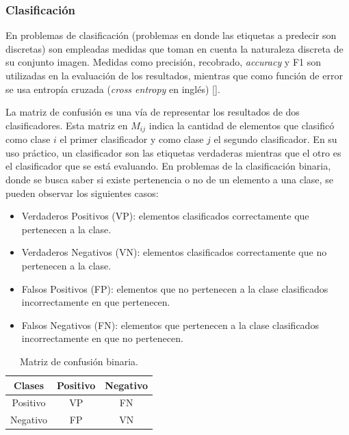 \subsubsection{Clasificación}

En problemas de clasificación (problemas en donde las etiquetas a predecir son discretas) 
son empleadas medidas que toman en cuenta la naturaleza discreta de su conjunto imagen.
Medidas como precisión, recobrado, \emph{accuracy} y F1 son utilizadas en la 
evaluación de los resultados, mientras que como función de error se usa entropía cruzada 
(\emph{cross entropy} en inglés) [\cite{grandini2020metrics}].

La matriz de confusión es una vía de representar los resultados de dos clasificadores. Esta matriz en $M_{ij}$ 
indica la cantidad de elementos que clasificó como clase $i$ el primer clasificador y
como clase $j$ el segundo clasificador. En su uso práctico,
un clasificador son las etiquetas verdaderas mientras que el otro es el clasificador que se está evaluando. 
En problemas de la clasificación binaria, donde se busca saber si existe pertenencia o no de un elemento a una clase,
se pueden observar los siguientes casos:

\begin{itemize}
	\item Verdaderos Positivos (VP): elementos clasificados correctamente que pertenecen a la clase.
	\item Verdaderos Negativos (VN): elementos clasificados correctamente que no pertenecen a la clase.
	\item Falsos Positivos (FP): elementos que no pertenecen a la clase clasificados incorrectamente en que pertenecen.
	\item Falsos Negativos (FN): elementos que pertenecen a la clase clasificados incorrectamente en que no pertenecen.
\end{itemize}

\begin{table}[h!]
	\begin{center}
		\begin{tabular}{|c|c|c|} \hline
		Clases		& Positivo	& Negativo  \\ \hline
		Positivo	& VP  		& FN		\\ \hline
		Negativo	& FP		& VN		\\ \hline
		\end{tabular}
	\caption{Matriz de confusión binaria.}\label{fig:confusion_matrix}
	\end{center}
\end{table}

